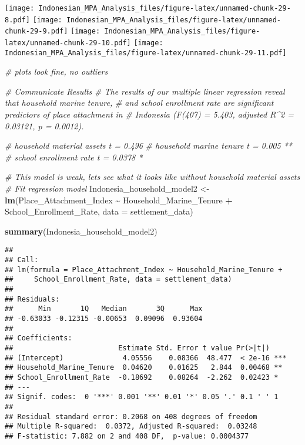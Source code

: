 \documentclass[
]{article}
\newenvironment{Shaded}{\begin{snugshade}}{\end{snugshade}}
\newcommand{\AttributeTok}[1]{\textcolor[rgb]{0.13,0.29,0.53}{#1}}
\newcommand{\CommentTok}[1]{\textcolor[rgb]{0.56,0.35,0.01}{\textit{#1}}}
\newcommand{\FunctionTok}[1]{\textcolor[rgb]{0.13,0.29,0.53}{\textbf{#1}}}
\newcommand{\NormalTok}[1]{#1}
\newcommand{\OtherTok}[1]{\textcolor[rgb]{0.56,0.35,0.01}{#1}}
\newcommand{\SpecialCharTok}[1]{\textcolor[rgb]{0.81,0.36,0.00}{\textbf{#1}}}
\newcommand{\StringTok}[1]{\textcolor[rgb]{0.31,0.60,0.02}{#1}}
\begin{document}
\texttt{[image: Indonesian\_MPA\_Analysis\_files/figure-latex/unnamed-chunk-29-8.pdf]}
\texttt{[image: Indonesian\_MPA\_Analysis\_files/figure-latex/unnamed-chunk-29-9.pdf]}
\texttt{[image: Indonesian\_MPA\_Analysis\_files/figure-latex/unnamed-chunk-29-10.pdf]}
\texttt{[image: Indonesian\_MPA\_Analysis\_files/figure-latex/unnamed-chunk-29-11.pdf]}

\begin{Shaded}
\begin{Highlighting}[]
\CommentTok{\# plots look fine, no outliers }

\CommentTok{\# Communicate Results}
\CommentTok{\# The results of our multiple linear regression reveal that household marine tenure, }
\CommentTok{\# and school enrollment rate are significant predictors of place attachment in }
\CommentTok{\# Indonesia (F(407) = 5.403, adjusted R\^{}2 = 0.03121, p = 0.0012). }

\CommentTok{\# household material assets t = 0.496}
\CommentTok{\# household marine tenure t = 0.005 **}
\CommentTok{\# school enrollment rate t  = 0.0378 *}


\CommentTok{\# This model is weak, let\textquotesingle{}s see what it looks like without household material assets}
\CommentTok{\# Fit regression model}
\NormalTok{Indonesia\_household\_model2 }\OtherTok{\textless{}{-}} \FunctionTok{lm}\NormalTok{(Place\_Attachment\_Index }\SpecialCharTok{\textasciitilde{}} \StringTok{\textasciigrave{}}\AttributeTok{Household\_Marine\_Tenure}\StringTok{\textasciigrave{}}
                                 \SpecialCharTok{+} \StringTok{\textasciigrave{}}\AttributeTok{School\_Enrollment\_Rate}\StringTok{\textasciigrave{}}\NormalTok{, }
                                \AttributeTok{data =}\NormalTok{ settlement\_data)}

\FunctionTok{summary}\NormalTok{(Indonesia\_household\_model2)}
\end{Highlighting}
\end{Shaded}

\begin{verbatim}
## 
## Call:
## lm(formula = Place_Attachment_Index ~ Household_Marine_Tenure + 
##     School_Enrollment_Rate, data = settlement_data)
## 
## Residuals:
##      Min       1Q   Median       3Q      Max 
## -0.63033 -0.12315 -0.00653  0.09096  0.93604 
## 
## Coefficients:
##                         Estimate Std. Error t value Pr(>|t|)    
## (Intercept)              4.05556    0.08366  48.477  < 2e-16 ***
## Household_Marine_Tenure  0.04620    0.01625   2.844  0.00468 ** 
## School_Enrollment_Rate  -0.18692    0.08264  -2.262  0.02423 *  
## ---
## Signif. codes:  0 '***' 0.001 '**' 0.01 '*' 0.05 '.' 0.1 ' ' 1
## 
## Residual standard error: 0.2068 on 408 degrees of freedom
## Multiple R-squared:  0.0372, Adjusted R-squared:  0.03248 
## F-statistic: 7.882 on 2 and 408 DF,  p-value: 0.0004377
\end{verbatim}
\end{document}
